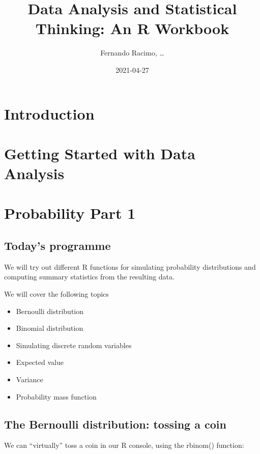 \documentclass[
]{book}
\title{Data Analysis and Statistical Thinking: An R Workbook}
\author{Fernando Racimo, \ldots{}}
\date{2021-04-27}
\providecommand{\tightlist}{%
  \setlength{\itemsep}{0pt}\setlength{\parskip}{0pt}}
\begin{document}
\maketitle

{
\setcounter{tocdepth}{1}
\tableofcontents
}
\hypertarget{introduction}{%
\chapter{Introduction}\label{introduction}}

\hypertarget{intro}{%
\chapter{Getting Started with Data Analysis}\label{intro}}

\hypertarget{prob1}{%
\chapter{Probability Part 1}\label{prob1}}

\hypertarget{todays-programme}{%
\section{Today's programme}\label{todays-programme}}

We will try out different R functions for simulating probability distributions and computing summary statistics from the resulting data.

We will cover the following topics

\begin{itemize}
\tightlist
\item
  Bernoulli distribution
\item
  Binomial distribution
\item
  Simulating discrete random variables
\item
  Expected value
\item
  Variance
\item
  Probability mass function
\end{itemize}

\hypertarget{the-bernoulli-distribution-tossing-a-coin}{%
\section{The Bernoulli distribution: tossing a coin}\label{the-bernoulli-distribution-tossing-a-coin}}

We can ``virtually'' toss a coin in our R console, using the rbinom() function:
\end{document}
